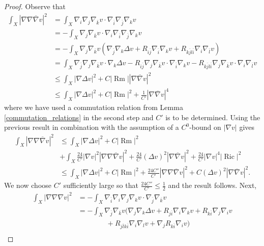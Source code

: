 \documentclass[12pt]{article}
\numberwithin{equation}{section}
\DeclareMathOperator{\Ric}{Ric}
\DeclareMathOperator{\Rm}{Rm}
\newcommand{\oo}[1]{\overline{#1}}
\begin{document}
\begin{proof}
Observe that
{\allowdisplaybreaks
\begin{align*}
    \int_X |\nabla \nabla \oo{\nabla} v|^2 &= \int_X \nabla_i \nabla_j \nabla_{\oo{k}} v \cdot \nabla_{\oo{i}} \nabla_{\oo{j}} \nabla_{k} v\\
    &=- \int_X \nabla_j \nabla_{\oo{k}} v \cdot \nabla_i \nabla_{\oo{i}} \nabla_{\oo{j}} \nabla_{k} v \\
    &=-\int_X \nabla_j \nabla_{\oo{k}} v (\nabla_{\oo{j}} \nabla_k \Delta v + R_{i \oo{j}} \nabla_{\oo{i}} \nabla_k v + R_{k\oo{j}l\oo{i}} \nabla_i \nabla_{\oo{l}} v)\\
    &= \int_X \nabla_{\oo{j}}\nabla_j \nabla_{\oo{k}} v \cdot \nabla_k \Delta v - R_{i\oo{j}} \nabla_j\nabla_{\oo{k}} v\cdot \nabla_{\oo{i}} \nabla_k v - R_{k\oo{j}l\oo{i}}\nabla_j \nabla_{\oo{k}} v \cdot \nabla_i \nabla_{\oo{l}} v\\
    &\leq \int_X |\nabla \Delta v|^2 + C|\Rm| |\nabla \oo{\nabla} v|^2\\
    &\leq \int_X |\nabla \Delta v|^2 + C|\Rm|^2 + \frac{1}{C'}|\nabla \oo{\nabla} v|^4
\end{align*}
}
where we have used a commutation relation from Lemma \ref{commutation_relations} in the second step and $C'$ is to be determined. Using the previous result in combination with the assumption of a $C^0$-bound on $|\nabla v|$ gives
\begin{align*}
    \int_X |\nabla \nabla \oo{\nabla} v|^2 &\leq \int_X |\nabla \Delta v|^2 + C|\Rm|^2\\
    &+ \int_X \frac{24}{C'}|\nabla v|^2|\nabla \nabla \oo{\nabla} v|^2 + \frac{24}{C'}(\Delta v)^2 |\nabla \oo{\nabla} v|^2 + \frac{24}{C'} |\nabla v|^4 |\Ric|^2\\
    &\leq \int_X |\nabla \Delta v|^2 + C|\Rm|^2 + \frac{24C''}{C'} |\nabla \nabla \oo{\nabla} v|^2 + C (\Delta v)^2|\nabla \oo{\nabla} v|^2.
\end{align*}
We now choose $C'$ sufficiently large so that $\frac{24C''}{C'} \leq \frac{1}{2}$ and the result follows. Next,
{\allowdisplaybreaks
\begin{align*}
    \int_X |\nabla \nabla \nabla v|^2 &= -\int_X \nabla_{\oo{i}} \nabla_i \nabla_j \nabla_k v \cdot \nabla_{\oo{j}} \nabla_{\oo{k}} v\\
    &= -\int_X \nabla_{\oo{j}} \nabla_{\oo{k}} v (\nabla_j \nabla_k \Delta v + R_{j \oo{i}} \nabla_i \nabla_{k} v + R_{k\oo{i}}\nabla_j\nabla_{i} v\\
    &\quad\quad\quad\quad+ R_{j\oo{l}k\oo{i}} \nabla_i \nabla_l v +\nabla_j R_{k \oo{i}} \nabla_i v)\\

\end{align*}}
\end{proof}
\end{document}
